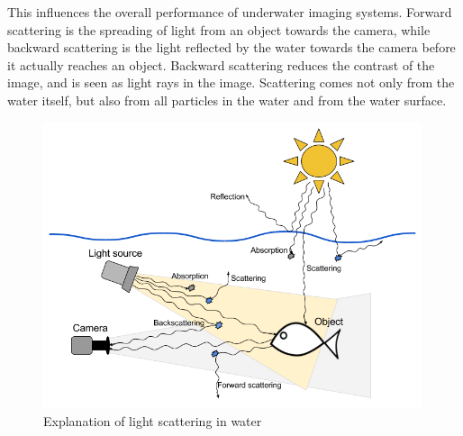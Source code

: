 This influences the overall performance of underwater imaging systems. Forward scattering is the spreading of light from an object towards the camera, while backward scattering is the light reflected by the water towards the camera before it actually reaches an object. Backward scattering reduces the contrast of the image, and is seen as light rays in the image. Scattering comes not only from the water itself, but also from all particles in the water and from the water surface.\cite{article:underwater_image_processing}

\begin{figure}[h]
    \centering
    \includegraphics[width=0.99\textwidth]{images/literature/light_scattering}
    \caption{Explanation of light scattering in water}
    \label{fig:light_scattering}
\end{figure}


